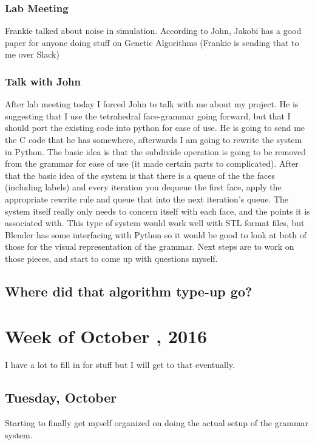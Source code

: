 \documentclass[letterpaper,oneside,titlepage]{article}
\begin{document}
\subsubsection{Lab Meeting}
Frankie talked about noise in simulation.  According to John, Jakobi has a good paper for anyone doing stuff on Genetic Algorithms (Frankie is sending that to me over Slack)
\subsubsection{Talk with John}
After lab meeting today I forced John to talk with me about my project.	 He is suggesting that I use the tetrahedral face-grammar \cite{Rieffel:face-grammar} going forward, but that I should port the existing code into python for ease of use.  He is going to send me the C code that he has somewhere, afterwards I am going to rewrite the system in Python.  The basic idea is that the subdivide operation is going to be removed from the grammar for ease of use (it made certain parts to complicated).  After that the basic idea of the system is that there is a queue of the the faces (including labels) and every iteration you dequeue the first face, apply the appropriate rewrite rule and queue that into the next iteration's queue.  The system itself really only needs to concern itself with each face, and the points it is associated with.  This type of system would work well with STL format files, but Blender has some interfacing with Python so it would be good to look at both of those for the visual representation of the grammar.  Next steps are to work on those pieces, and start to come up with questions myself.

\subsection{Where did that algorithm type-up go?}


\section{Week of October , 2016}
I have a lot to fill in for stuff but I will get to that eventually.

\subsection{Tuesday, October }
Starting to finally get myself organized on doing the actual setup of the grammar system.
\end{document}
